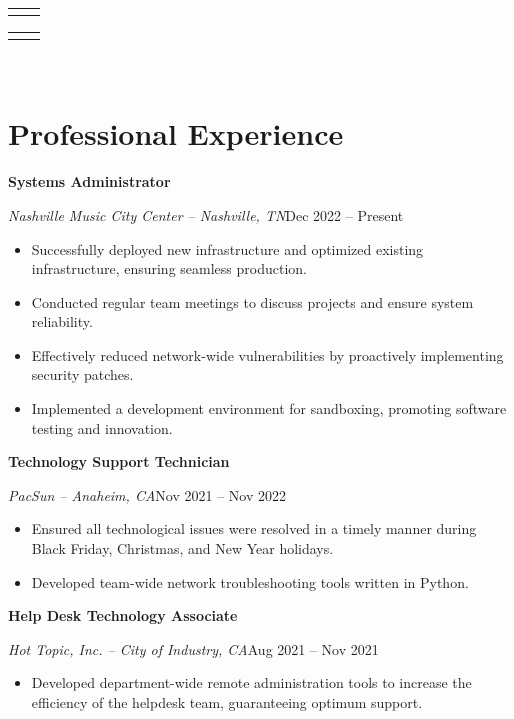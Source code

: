 \documentclass[a4paper]{article}
\makeatletter
\renewcommand{\maketitle}{
  \begin{widebox}
    {\bfseries\LARGE\textsf\theauthor} \\
    \medskip{}
    \begin{tabular}{@{}c|c@{}}
        \faIcon{linkedin} \textsf{\applinkedinurl{}} & \faIcon{github} \textsf{\appgithuburl{}}
    \end{tabular}
    \begin{tabular}{@{}c|c@{}}
        \faIcon{mobile} \textsf{\appcellphone{}} & \faIcon{envelope} \textsf{\appemail{}}
    \end{tabular} \\
    \medskip{}
    \faIcon{home} \textsf{\appaddress{}}
  \end{widebox}
}
\makeatother
\begin{document}
\author{\textsf{\appfirstname{} \applastname{}}}

\maketitle

\section{Professional Experience}
\textbf{Systems Administrator}\par
\textit{Nashville Music City Center -- Nashville, TN}\hfill Dec 2022 -- Present

\begin{itemize}[noitemsep,nolistsep]
    \item Successfully deployed new infrastructure and optimized existing infrastructure, ensuring seamless production.
    \item Conducted regular team meetings to discuss projects and ensure system reliability.
    \item Effectively reduced network-wide vulnerabilities by proactively implementing security patches.
    \item Implemented a development environment for sandboxing, promoting software testing and innovation.
\end{itemize}

\vspace{0.5em}
\textbf{Technology Support Technician}\par
\textit{PacSun -- Anaheim, CA}\hfill Nov 2021 -- Nov 2022

\begin{itemize}[noitemsep,nolistsep]
    \item Ensured all technological issues were resolved in a timely manner during Black Friday, Christmas, and New Year holidays.
    \item Developed team-wide network troubleshooting tools written in Python.
\end{itemize}

\vspace{0.5em}
\textbf{Help Desk Technology Associate}\par
\textit{Hot Topic, Inc. -- City of Industry, CA}\hfill Aug 2021 -- Nov 2021

\begin{itemize}[noitemsep,nolistsep]
    \item Developed department-wide remote administration tools to increase the efficiency of the helpdesk team, guaranteeing optimum support.
\end{itemize}
\end{document}
